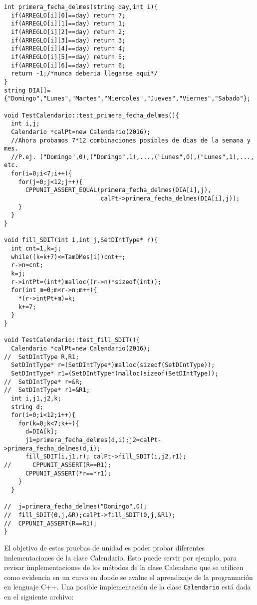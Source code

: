 \documentclass{article}
\begin{document}
\begin{verbatim}
int primera_fecha_delmes(string day,int i){
  if(ARREGLO[i][0]==day) return 7;
  if(ARREGLO[i][1]==day) return 1;
  if(ARREGLO[i][2]==day) return 2;
  if(ARREGLO[i][3]==day) return 3;
  if(ARREGLO[i][4]==day) return 4;
  if(ARREGLO[i][5]==day) return 5;
  if(ARREGLO[i][6]==day) return 6;
  return -1;/*nunca deberia llegarse aqui*/
}
string DIA[]={"Domingo","Lunes","Martes","Miercoles","Jueves","Viernes","Sabado"};

void TestCalendario::test_primera_fecha_delmes(){
  int i,j;
  Calendario *calPt=new Calendario(2016);
  //Ahora probamos 7*12 combinaciones posibles de dias de la semana y mes.
  //P.ej. ("Domingo",0),("Domingo",1),...,("Lunes",0),("Lunes",1),..., etc.
  for(i=0;i<7;i++){
    for(j=0;j<12;j++){
      CPPUNIT_ASSERT_EQUAL(primera_fecha_delmes(DIA[i],j),
                           calPt->primera_fecha_delmes(DIA[i],j));
    }
  }
}

void fill_SDIT(int i,int j,SetDIntType* r){
  int cnt=1,k=j;
  while((k=k+7)<=TamDMes[i])cnt++;
  r->n=cnt;
  k=j;
  r->intPt=(int*)malloc((r->n)*sizeof(int));
  for(int m=0;m<r->n;m++){
    *(r->intPt+m)=k;
    k+=7;
  }
}

void TestCalendario::test_fill_SDIT(){
  Calendario *calPt=new Calendario(2016);
//  SetDIntType R,R1;
  SetDIntType* r=(SetDIntType*)malloc(sizeof(SetDIntType));
  SetDIntType* r1=(SetDIntType*)malloc(sizeof(SetDIntType));
//  SetDIntType* r=&R;
//  SetDIntType* r1=&R1;
  int i,j1,j2,k;
  string d;
  for(i=0;i<12;i++){
    for(k=0;k<7;k++){
      d=DIA[k];
      j1=primera_fecha_delmes(d,i);j2=calPt->primera_fecha_delmes(d,i);
      fill_SDIT(i,j1,r); calPt->fill_SDIT(i,j2,r1);
//      CPPUNIT_ASSERT(R==R1);
      CPPUNIT_ASSERT(*r==*r1);
    }
  }

//  j=primera_fecha_delmes("Domingo",0);
//  fill_SDIT(0,j,&R);calPt->fill_SDIT(0,j,&R1);
//  CPPUNIT_ASSERT(R==R1);
}
\end{verbatim}
El objetivo de estas pruebas de unidad es poder probar diferentes 
imlementaciones de la clase Calendario. Esto puede servir por ejemplo, 
para revisar implementaciones de los m\'etodos de la clase Calendario 
que se utilicen como evidencia en un curso en donde se evalue el 
aprendizaje de la programaci\'on en lenguaje C++. Una posible 
implementaci\'on de la clase {\tt Calendario} est\'a dada en el 
siguiente archivo:
\end{document}
